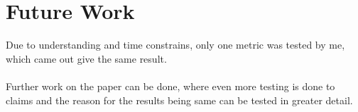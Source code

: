 \chapter*{Future Work}
Due to understanding and time constrains, only 
one metric was tested by me, which came out 
give the same result.
\\\\
Further work on the paper can be done, where 
even more testing is done to claims and the 
reason for the results being same can be 
tested in greater detail. 